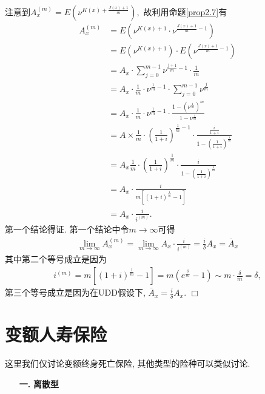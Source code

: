 \documentclass[a4paper,openany, 10pt]{ctexbook}
\newcommand{\hei}{\CJKfamily{hei}}      %
\def\qed{\hfill$\Box$\medskip}
\begin{document}
\proof
注意到$A_{x}^{(m)}=E(\nu^{K(x)+\frac{J(x)+1}{m}}),$ 故利用命题\ref{prop2.7}有
\begin{align*}
    A_{x}^{(m)} & =E(\nu^{K(x)+1}\cdot \nu^{\frac{J(x)+1}{m}-1})                                                                        \\
                & = E(\nu^{K(x)+1})\cdot E(\nu^{\frac{J(x)+1}{m}-1})                                                                    \\
                & =A_{x}\cdot\sum_{j=0}^{m-1}\nu^{\frac{j+1}{m}-1}\cdot\frac{1}{m}                                                      \\
                & =A_{x}\cdot\frac{1}{m}\cdot \nu^{\frac{1}{m}-1}\cdot\sum_{j=0}^{m-1}\nu^{\frac{j}{m}}                                 \\
                & =A_{x}\cdot\frac{1}{m}\cdot \nu^{\frac{1}{m}-1}\cdot\frac{1-(\nu^{\frac{1}{m}})^{m}}{1-\nu^{\frac{1}{m}}}         \\
                & =A\times\frac{1}{m}\cdot(\frac{1}{1+i})^{\frac{1}{m}-1}\cdot\frac{\frac{i}{1+i}}{1-(\frac{1}{1+i})^{\frac{1}{m}}} \\
                & =A_{x}\frac{1}{m}\cdot(\frac{1}{1+i})^{\frac{1}{m}}\cdot\frac{i}{1-(\frac{1}{1+i})^{\frac{1}{m}}}                 \\
                & =A_{x}\cdot\frac{i}{m[(1+i)^{\frac{1}{m}}-1]}                                                                     \\
                & =A_{x}\cdot\frac{i}{i^{(m)}}.
\end{align*}
第一个结论得证. 第一个结论中令$m\to\infty$可得
\begin{align*}
    \lim_{m\to\infty}A_{x}^{(m)}=\lim_{m\to\infty}A_{x}\cdot\frac{i}{i^{(m)}}=\frac{i}{\delta}A_{x}=\overline{A}_{x}
\end{align*}
其中第二个等号成立是因为
\begin{align*}
    i^{(m)}=m[(1+i)^{\frac{1}{m}}-1]=m(e^{\frac{\delta}{m}}-1)\sim m\cdot\frac{\delta}{m}=\delta,
\end{align*}
第三个等号成立是因为在UDD假设下, $\overline{A}_{x}=\frac{i}{\delta}A_{x}.$
\qed

\section{变额人寿保险}
这里我们仅讨论变额终身死亡保险, 其他类型的险种可以类似讨论.

\begin{itemize}
    \item[{\bf\hei 一.}]{\bf\hei 离散型}
\end{itemize}
\end{document}
